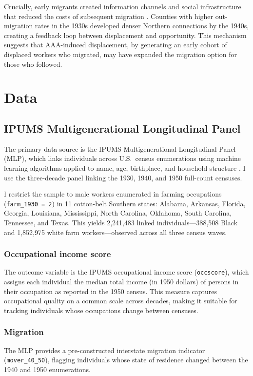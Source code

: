 \documentclass[12pt]{article}
\begin{document}
Crucially, early migrants created information channels and social infrastructure that reduced the costs of subsequent migration \citep{stuart2022social}. Counties with higher out-migration rates in the 1930s developed denser Northern connections by the 1940s, creating a feedback loop between displacement and opportunity. This mechanism suggests that AAA-induced displacement, by generating an early cohort of displaced workers who migrated, may have expanded the migration option for those who followed.

\section{Data}
\label{sec:data}

\subsection{IPUMS Multigenerational Longitudinal Panel}

The primary data source is the IPUMS Multigenerational Longitudinal Panel (MLP), which links individuals across U.S.\ census enumerations using machine learning algorithms applied to name, age, birthplace, and household structure \citep{helgertz2023multigenerational}. I use the three-decade panel linking the 1930, 1940, and 1950 full-count censuses.

I restrict the sample to male workers enumerated in farming occupations (\texttt{farm\_1930 = 2}) in 11 cotton-belt Southern states: Alabama, Arkansas, Florida, Georgia, Louisiana, Mississippi, North Carolina, Oklahoma, South Carolina, Tennessee, and Texas. This yields 2,241,483 linked individuals---388,508 Black and 1,852,975 white farm workers---observed across all three census waves.

\subsubsection*{Occupational income score} The outcome variable is the IPUMS occupational income score (\texttt{occscore}), which assigns each individual the median total income (in 1950 dollars) of persons in their occupation as reported in the 1950 census. This measure captures occupational quality on a common scale across decades, making it suitable for tracking individuals whose occupations change between censuses.

\subsubsection*{Migration} The MLP provides a pre-constructed interstate migration indicator (\texttt{mover\_40\_50}), flagging individuals whose state of residence changed between the 1940 and 1950 enumerations.
\end{document}
